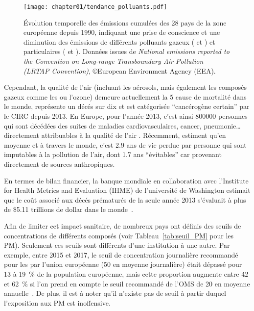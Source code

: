 \begin{figure}[ht]
    \centering
    \texttt{[image: chapter01/tendance\_polluants.pdf]}
    \caption{Évolution temporelle des émissions cumulées des 28 pays de la zone européenne
    depuis 1990, indiquant une prise de conscience et une diminution des émissions de
    différents polluants gazeux ( et ) et particulaires (\PMdix{} et \PMdc). Données
issues de \textit{National emissions reported to the Convention on Long-range
Transboundary Air Pollution (LRTAP Convention)}, ©European Environment Agency (EEA).}%
\label{fig:chapter01/tendance_polluants}
\end{figure}


Cependant, la qualité de l'air (incluant les aérosols, mais également les
composés gazeux comme les  ou l'ozone) demeure actuellement la 5\ieme{} cause de
mortalité dans le monde, représente un décés sur dix et est catégorisée ``cancérogène
certain'' par le CIRC depuis 2013. En Europe, pour l'année 2013, c'est
ainsi \num{800000} personnes qui sont décédées des suites de maladies cardiovasculaires,
cancer, pneumonie… directement attribuables à la qualité de l'air
\autocite{worldhealthorganizationAmbient2016}. Récemment, \cite{lelieveldLoss2020}
estiment qu'en moyenne et à travers le monde, c'est \num{2.9} ans de vie perdue par personne
qui sont imputables à la pollution de l'air, dont \num{1.7} ans ``évitables'' car provenant
directement de sources anthropiques.

En termes de bilan financier, la banque mondiale en collaboration avec l'Institute for
Health Metrics and Evaluation (IHME) de l'université de Washington estimait que le coût
associé aux décés prématurés de la seule année 2013 s'évaluait à plus de \$5.11 trillions
de dollar dans le monde~\autocite{worldbankCost2016}.

Afin de limiter cet impact sanitaire, de nombreux pays ont définis des seuils de
concentrations de différents composés (voir Tableau~\ref{tab:seuil_PM} pour les PM).
Seulement ces seuils sont différents d'une institution à une autre. Par exemple, entre
2015 et 2017, le seuil de concentration journalière recommandé pour les \PMdix{} par
l'union européenne (\SI{50}{\ugm} en moyenne journalière) était dépassé pour 13 à
19~\% de la population européenne, mais cette proportion augmente entre 42 et 62~\% si
l'on prend en compte le seuil recommandé de l'OMS de \SI{20}{\ugm} en moyenne
annuelle~\autocite{europeanenvironmentagencyAir2019}.  De plus, il est à noter qu'il
n'existe pas de seuil à partir duquel l'exposition aux PM est inoffensive.

